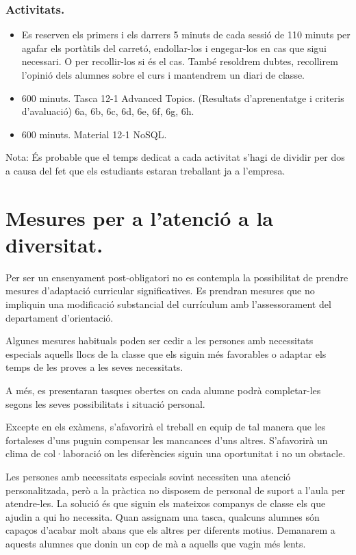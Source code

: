 \documentclass[catalan, a4paper, 12pt, titlepage]{article}
\begin{document}
  \subsubsection{Activitats.}
  \begin{itemize}
          \item Es reserven els primers i els darrers 5 minuts de cada sessió de 110 minuts per agafar els portàtils del carretó, endollar-los i engegar-los en cas que sigui necessari. O per recollir-los si és el cas. També resoldrem dubtes, recollirem l'opinió dels alumnes sobre el curs i mantendrem un diari de classe.
	  \item 600 minuts. Tasca 12-1 Advanced Topics. (\faGraduationCap Resultats d'aprenentatge i criteris d'avaluació) 6a, 6b, 6c, 6d, 6e, 6f, 6g, 6h.
	  \item 600 minuts. Material 12-1 NoSQL.
  \end{itemize}

  Nota: És probable que el temps dedicat a cada activitat s'hagi de dividir per dos a causa del fet que els estudiants estaran treballant ja a l'empresa.


\section{Mesures per a l'atenció a la diversitat.}
\label{sec:diversitat}

Per ser un ensenyament post-obligatori no es contempla la possibilitat de prendre mesures d'adaptació curricular significatives. Es prendran mesures que no impliquin una modificació substancial del currículum amb l'assessorament del departament d'orientació.

Algunes mesures habituals poden ser cedir a les persones amb necessitats especials aquells llocs de la classe que els siguin més favorables o adaptar els temps de les proves a les seves necessitats.

A més, es presentaran tasques obertes on cada alumne podrà completar-les segons les seves possibilitats i situació personal.

Excepte en els exàmens, s'afavorirà el treball en equip de tal manera que les fortaleses d'uns puguin compensar les mancances d'uns altres. S'afavorirà un clima de col·laboració on les diferències siguin una oportunitat i no un obstacle.

Les persones amb necessitats especials sovint necessiten una atenció personalitzada, però a la pràctica no disposem de personal de suport a l'aula per atendre-les.
La solució és que siguin els mateixos companys de classe els que ajudin a qui ho necessita.
Quan assignam una tasca, qualcuns alumnes són capaços d'acabar molt abans que els altres per diferents motius.
Demanarem a aquests alumnes que donin un cop de mà a aquells que vagin més lents.
\end{document}
